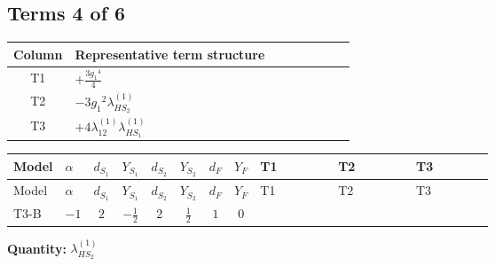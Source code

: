 \documentclass[8pt]{article}
\begin{document}
\begin{landscape}
\subsection*{Terms 4 of 6}
\begin{center}
\begin{tabular}{@{}c >{\raggedright\arraybackslash}p{0.82\linewidth}@{}}
\toprule
Column & Representative term structure \\
\midrule
T1 & \(\displaystyle +\frac{3 {g_1}^4}{4}\) \\
\midrule
T2 & \(\displaystyle -3 {g_1}^2 {\lambda_{HS_2}^{(1)}}\) \\
\midrule
T3 & \(\displaystyle +4 {\lambda_{12}^{(1)}} {\lambda_{HS_1}^{(1)}}\) \\
\midrule
\bottomrule
\end{tabular}
\end{center}
\smallskip
\tiny
\begin{longtable}{@{}llcccccc >{\raggedright\arraybackslash}p{0.21\linewidth} >{\raggedright\arraybackslash}p{0.21\linewidth} >{\raggedright\arraybackslash}p{0.21\linewidth}@{}}
\toprule
Model & $\alpha$ & $d_{S_1}$ & $Y_{S_1}$ & $d_{S_2}$ & $Y_{S_2}$ & $d_F$ & $Y_F$ & T1 & T2 & T3 \\
\midrule
\endfirsthead
\toprule
Model & $\alpha$ & $d_{S_1}$ & $Y_{S_1}$ & $d_{S_2}$ & $Y_{S_2}$ & $d_F$ & $Y_F$ & T1 & T2 & T3 \\
\midrule
\endhead
T3-B & $-1$ & $2$ & $-\frac{1}{2}$ & $2$ & $\frac{1}{2}$ & $1$ & $0$ & \scriptsize\adjustbox{max width=\linewidth}{$\begin{gathered} +\frac{3 {g_1}^4}{4}\end{gathered}$} & \scriptsize\adjustbox{max width=\linewidth}{$\begin{gathered} -3 {g_1}^2 {\lambda_{HS_2}^{(1)}}\end{gathered}$} & \scriptsize\adjustbox{max width=\linewidth}{$\begin{gathered} +4 {\lambda_{12}^{(1)}} {\lambda_{HS_1}^{(1)}}\end{gathered}$} \\
\midrule
\bottomrule
\end{longtable}
\clearpage
\noindent\textbf{Quantity: }$\lambda_{HS_2}^{(1)}$\par\smallskip

\end{landscape}
\end{document}
